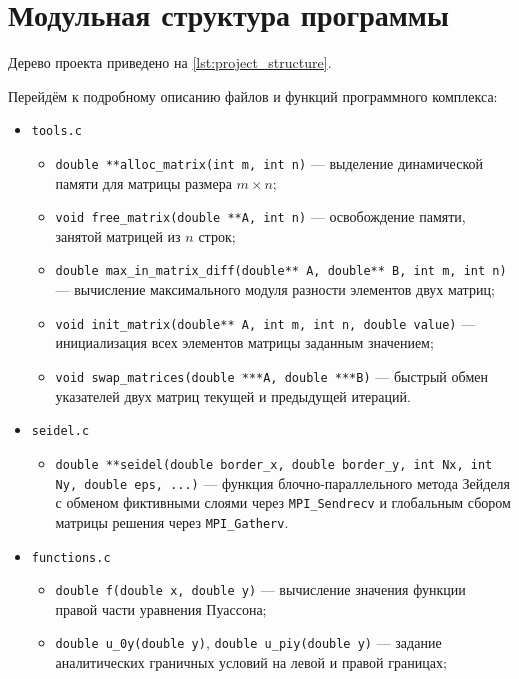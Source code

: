 \section{Модульная структура программы}
Дерево проекта приведено на \autoref{lst:project_structure}.

Перейдём к подробному описанию файлов и функций программного комплекса:

\begin{itemize}
	\item \texttt{tools.c}
	\begin{itemize}
		\item \texttt{double **alloc\_matrix(int m, int n)} — выделение динамической памяти для матрицы размера $m \times n$;
		\item \texttt{void free\_matrix(double **A, int n)} — освобождение памяти, занятой матрицей из $n$ строк;
		\item \texttt{double max\_in\_matrix\_diff(double** A, double** B, int m, int n)} — вычисление максимального модуля разности элементов двух матриц;
		\item \texttt{void init\_matrix(double** A, int m, int n, double value)} — инициализация всех элементов матрицы заданным значением;
		\item \texttt{void swap\_matrices(double ***A, double ***B)} — быстрый обмен указателей двух матриц текущей и предыдущей итераций.
	\end{itemize}
	\item \texttt{seidel.c}
	\begin{itemize}
		\item \texttt{double **seidel(double border\_x, double border\_y, int Nx, int Ny, double eps, ...)} — функция блочно-параллельного метода Зейделя с обменом фиктивными слоями через \texttt{MPI\_Sendrecv} и глобальным сбором матрицы решения через \texttt{MPI\_Gatherv}.
	\end{itemize}
	\item \texttt{functions.c}
	\begin{itemize}
		\item \texttt{double f(double x, double y)} — вычисление значения функции правой части уравнения Пуассона;
		\item \texttt{double u\_0y(double y)}, \texttt{double u\_piy(double y)} — задание аналитических граничных условий на левой и правой границах;

\end{itemize}
\end{itemize}
